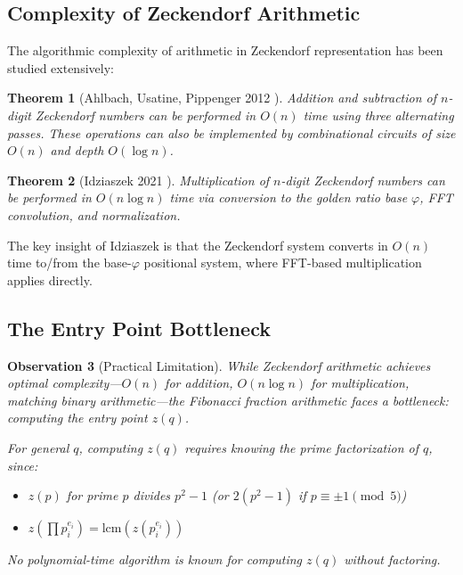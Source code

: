 \documentclass[11pt]{article}
\newtheorem{theorem}{Theorem}
\newtheorem{observation}[theorem]{Observation}
\begin{document}
\subsection{Complexity of Zeckendorf Arithmetic}

The algorithmic complexity of arithmetic in Zeckendorf representation has been studied extensively:

\begin{theorem}[Ahlbach, Usatine, Pippenger 2012 \cite{ahlbach2012}]
Addition and subtraction of $n$-digit Zeckendorf numbers can be performed in $O(n)$ time using three alternating passes. These operations can also be implemented by combinational circuits of size $O(n)$ and depth $O(\log n)$.
\end{theorem}

\begin{theorem}[Idziaszek 2021 \cite{idziaszek2021}]
Multiplication of $n$-digit Zeckendorf numbers can be performed in $O(n \log n)$ time via conversion to the golden ratio base $\varphi$, FFT convolution, and normalization.
\end{theorem}

The key insight of Idziaszek is that the Zeckendorf system converts in $O(n)$ time to/from the base-$\varphi$ positional system, where FFT-based multiplication applies directly.

\subsection{The Entry Point Bottleneck}

\begin{observation}[Practical Limitation]
While Zeckendorf arithmetic achieves optimal complexity---$O(n)$ for addition, $O(n \log n)$ for multiplication, matching binary arithmetic---the \emph{Fibonacci fraction} arithmetic faces a bottleneck: computing the entry point $z(q)$.

For general $q$, computing $z(q)$ requires knowing the prime factorization of $q$, since:
\begin{itemize}
    \item $z(p)$ for prime $p$ divides $p^2 - 1$ (or $2(p^2-1)$ if $p \equiv \pm 1 \pmod{5}$)
    \item $z(\prod p_i^{e_i}) = \mathrm{lcm}(z(p_i^{e_i}))$
\end{itemize}
No polynomial-time algorithm is known for computing $z(q)$ without factoring.
\end{observation}
\end{document}
